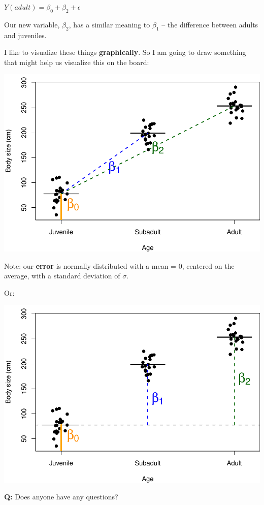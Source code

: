 \documentclass[
]{article}
\begin{document}
\textbf{\(Y(adult) = \beta_0 + \beta_2 + \epsilon\)}

Our new variable, \(\beta_2\), has a similar meaning to \(\beta_1\) --
the difference between adults and juveniles.

I like to visualize these things \textbf{graphically}. So I am going to
draw something that might help us visualize this on the board:

\includegraphics{lecture_9_files/figure-latex/stripplot-1.pdf}

Note: our \textbf{error} is normally distributed with a mean = 0,
centered on the average, with a standard deviation of \(\sigma\).

Or:

\includegraphics{lecture_9_files/figure-latex/stripplot-2-1.pdf}

\textbf{Q:} Does anyone have any questions?
\end{document}
